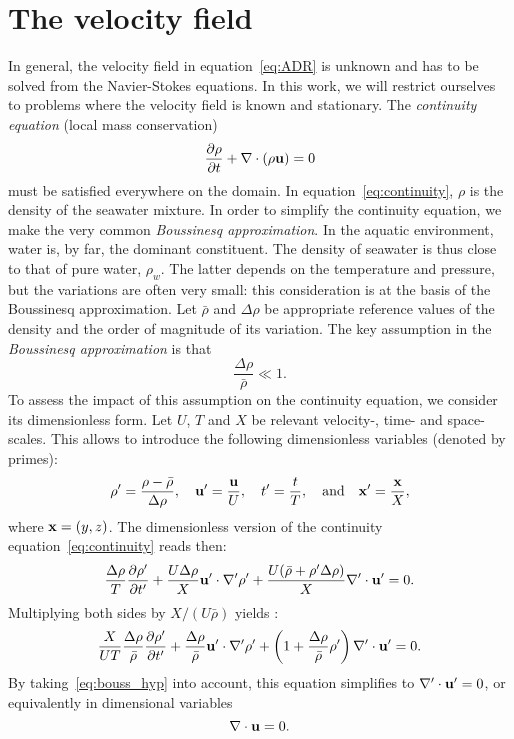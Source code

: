 \section{The velocity field}
In general, the velocity field in equation~\eqref{eq:ADR} is unknown and has to be solved from the Navier-Stokes equations. In this work, we will restrict ourselves to problems where the velocity field is known and stationary. The \textit{continuity equation} (local mass conservation)
\begin{equation} \label{eq:continuity}
	\frac{\partial \rho}{\partial t} + \nabla \cdot (\rho \mathbf u) = 0
\end{equation}
must be satisfied everywhere on the domain. In equation~\eqref{eq:continuity}, $\rho$ is the density of the seawater mixture. In order to simplify the continuity equation, we make the very common \textit{Boussinesq approximation}. In the aquatic environment, water is, by far, the dominant constituent. The density of seawater is thus close to that of pure water, $\rho_w$. The latter depends on the temperature and pressure, but the variations are often very small: this consideration is at the basis of the Boussinesq approximation. Let $\bar{\rho}$ and $\Delta\rho$ be appropriate reference values of the density and the order of magnitude of its variation. The key assumption in the \textit{Boussinesq approximation} is that
\begin{equation} \label{eq:bouss_hyp}
	\frac{\Delta \rho}{\bar{\rho}} \ll 1.
\end{equation}
To assess the impact of this assumption on the continuity equation, we consider its dimensionless form. Let $U$, $T$ and $X$ be relevant velocity-, time- and space-scales. This allows to introduce the following dimensionless variables (denoted by primes):
\begin{equation}
	\rho' = \frac{\rho - \bar{\rho}}{\Delta \rho}, \quad \mathbf u' = \frac{\mathbf u}{U}, \quad t' = \frac{t}{T}, \quad \mbox{and} \quad \mathbf x' = \frac{\mathbf x}{X},
\end{equation}
where $\mathbf x = (y,z)$. The dimensionless version of the continuity equation~\eqref{eq:continuity} reads then: 
\begin{equation}
	\frac{\Delta \rho}{T}\frac{\partial \rho'}{\partial t'} + \frac{U\Delta \rho}{X}\mathbf u' \cdot \nabla' \rho' + \frac{U(\bar{\rho}+ \rho' \Delta \rho)}{X}\nabla' \cdot \mathbf u' = 0.
\end{equation}
Multiplying both sides by $X/(U\bar{\rho})$ yields :
\begin{equation}
	\frac{X}{UT}\frac{\Delta \rho}{\bar{\rho}}\frac{\partial \rho'}{\partial t'} + \frac{\Delta \rho}{\bar{\rho}}\mathbf u' \cdot \nabla' \rho' + \left(1+\frac{\Delta \rho}{\bar{\rho}}\rho'\right)\nabla' \cdot \mathbf u' = 0.
\end{equation}
By taking~\eqref{eq:bouss_hyp} into account, this equation simplifies to $\nabla' \cdot \mathbf u' = 0$, or equivalently in dimensional variables 
\begin{equation}
	\nabla \cdot \mathbf u = 0.
\end{equation}

